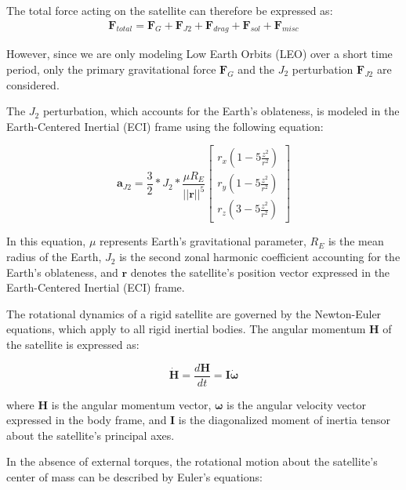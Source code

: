 \noindent The total force acting on the satellite can therefore be expressed as:
\begin{align}
    \mathbf{F}_{total} = \mathbf{F}_{G} + \mathbf{F}_{J2} + \mathbf{F}_{drag} + \mathbf{F}_{sol} + \mathbf{F}_{misc}
\end{align}

\noindent However, since we are only modeling Low Earth Orbits (LEO) over a short time period, only the primary gravitational force $\mathbf{F}_G$ and the $J_2$ 
perturbation $\mathbf{F}_{J2}$ are considered.

\noindent The $J_2$ perturbation, which accounts for the Earth's oblateness, is modeled in the Earth-Centered Inertial (ECI) frame using the following equation:

\begin{equation}
\mathbf{a}_{J2} = \frac{3}{2}*J_2*\frac{\mu R_E}{||\mathbf{r}||^5}
\begin{bmatrix}r_x(1-5\frac{z^2}{r^2}) \\
 r_y(1-5\frac{z^2}{r^2})\\
 r_z(3-5\frac{z^2}{r^2}) \end{bmatrix}
\end{equation}

\noindent In this equation, $\mu$ represents Earth's gravitational parameter, $R_E$ is the 
mean radius of the Earth, $J_2$ is the second zonal harmonic coefficient accounting for the Earth's 
oblateness, and $\mathbf{r}$ denotes the satellite's position vector expressed in the Earth-Centered Inertial (ECI) frame.


The rotational dynamics of a rigid satellite are governed by the Newton-Euler equations, which apply to all rigid inertial bodies.
 The angular momentum $\mathbf{H}$ of the satellite is expressed as:

\begin{equation}
\dot{\mathbf{H}} = \frac{d\mathbf{H}}{dt} = \mathbf{I}\dot{\boldsymbol{\omega}}
\end{equation}

\noindent where $\mathbf{H}$ is the angular momentum vector, $\boldsymbol{\omega}$ is the angular velocity vector expressed in the body 
frame, and $\mathbf{I}$ is the diagonalized moment of inertia tensor about the satellite's principal axes.
\vspace{0.5cm}

\noindent In the absence of external torques, the rotational motion about the satellite's center of mass can be described by Euler's equations:

